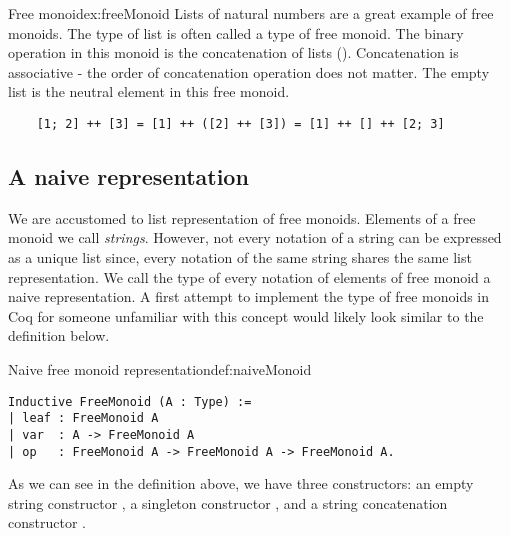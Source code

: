 \begin{example}{Free monoid}{ex:freeMonoid}
Lists of natural numbers are a great example of free monoids. The type of list is often called a type of free monoid. The binary operation in this monoid is the concatenation of lists (\mcoq{++}). Concatenation is associative - the order of concatenation operation does not matter. The empty list is the neutral element in this free monoid.
\begin{verbatim}
    [1; 2] ++ [3] = [1] ++ ([2] ++ [3]) = [1] ++ [] ++ [2; 3]
\end{verbatim}
\end{example}
\subsection{A naive representation}
We are accustomed to list representation of free monoids. Elements of a free monoid we call \emph{strings}. However, not every notation of a string can be expressed as a unique list since, every notation of the same string shares the same list representation. We call the type of every notation of elements of free monoid a naive representation. A first attempt to implement the type of free monoids in Coq for someone unfamiliar with this concept would likely look similar to the definition below. 
\begin{defi}{Naive free monoid representation}{def:naiveMonoid}
\begin{verbatim}
Inductive FreeMonoid (A : Type) :=
| leaf : FreeMonoid A
| var  : A -> FreeMonoid A
| op   : FreeMonoid A -> FreeMonoid A -> FreeMonoid A.
\end{verbatim}
\end{defi}
As we can see in the definition above, we have three constructors: an empty string constructor , a singleton constructor , and a string concatenation constructor . 
